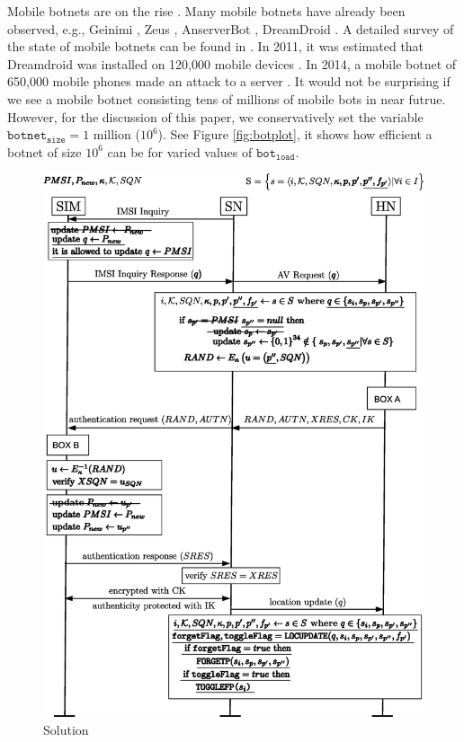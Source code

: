 \documentclass{llncs} %
\begin{document}
Mobile botnets are on the rise \cite{botnet_ccs09_symbian,botnet_usenix11,botnet_australia_2016}. Many mobile botnets have already been observed, e.g., Geinimi \cite{botnet_geinimi10}, Zeus \cite{botnet_zeus11}, AnserverBot \cite{botnet_anserverbot}, DreamDroid \cite{botnet_dreamdroid11}. A detailed survey of the state of mobile botnets can be found in \cite{botnet_threat15}. In 2011, it was estimated that Dreamdroid was installed on 120,000 mobile devices \cite{botnet_dreamdroid11}. In 2014, a mobile botnet of 650,000 mobile phones made an attack to a server \cite{chinese_spam}. It would not be surprising if we see a mobile botnet consisting tens of millions of mobile bots in near futrue. However, for the discussion of this paper, we conservatively set the variable $\texttt{botnet}_{\texttt{size}} = 1$ million ($10^6$). See Figure \ref{fig:botplot}, it shows how efficient a botnet of size $10^6$ can be for varied values of $\texttt{bot}_{\texttt{load}}$.



\begin{figure}[]
  \centering
    \includegraphics[width=\textwidth]{solution.eps}
  \caption{Solution}
  \label{fig:solution}	
\end{figure}
\end{document}
